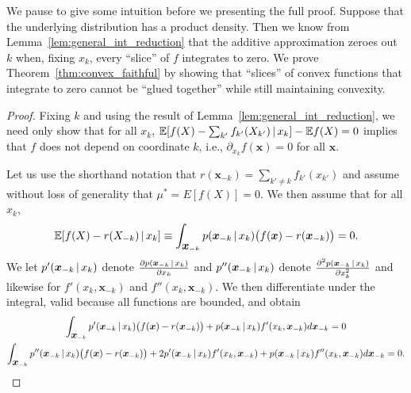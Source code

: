 We pause to give some intuition before we presenting the full proof.
Suppose that the underlying distribution has a product density.
Then we know from Lemma~\ref{lem:general_int_reduction} that the
additive approximation zeroes out $k$ when, fixing $x_k$, every
``slice'' of $f$ integrates to zero. We prove
Theorem~\ref{thm:convex_faithful} by showing that ``slices'' of convex
functions that integrate to zero cannot be ``glued together'' while
still maintaining convexity.


\begin{proof}

Fixing $k$ and using the result of
Lemma~\ref{lem:general_int_reduction}, 
we need only show that for all $x_k$, $ {\mathbb E}[ f(X) - \sum_{k'}
f_{k'}(X_{k'}) {\,|\,} x_k] - {\mathbb E} f(X) = 0 $ 
implies that $f$ does not depend on coordinate $k$, i.e., 
$\partial_{x_k} f(\mathbf{x}) = 0$ for all $\mathbf{x}$.

Let us use the shorthand notation that $r(\mathbf{x}_{-k}) = \sum_{k'
  \neq k} f_{k'}(x_{k'})$ and assume without loss of generality that
$\mu^* = E[f(X)] = 0$. We then assume that for all $x_k$,
\begin{equation}
 {\mathbb E}[ f(X) - r(X_{-k})  {\,|\,} x_k] \equiv 
 \int_{\mbox{\boldmath $x$}_{-k}}  p(\mbox{\boldmath $x$}_{-k} {\,|\,} x_k ) 
 \big(f(\mbox{\boldmath $x$}) - r(\mbox{\boldmath $x$}_{-k}) \big) = 0.
\end{equation}
We let $p'(\mbox{\boldmath $x$}_{-k} {\,|\,} x_k)$ denote 
$\frac{\partial p(\mbox{\boldmath $\scriptstyle x$}_{-k} {\,|\,} x_k)}{\partial x_k}$ and 
$p''(\mbox{\boldmath $x$}_{-k} {\,|\,} x_k)$ denote 
$\frac{\partial^2 p(\mbox{\boldmath $\scriptstyle x$}_{-k} {\,|\,} x_k)}{\partial x_k^2}$ and
likewise for $f'(x_k, \mathbf{x}_{-k})$ and $f''(x_k,
\mathbf{x}_{-k})$. We then differentiate under the integral, valid
because all functions are bounded, and obtain
\begin{gather}
\int_{\mbox{\boldmath $x$}_{-k}} p'(\mbox{\boldmath $x$}_{-k} {\,|\,} x_k) 
\big( f(\mbox{\boldmath $x$}) - r(\mbox{\boldmath $x$}_{-k}) \big) + 
p(\mbox{\boldmath $x$}_{-k} {\,|\,} x_k) f'(x_k, \mbox{\boldmath $x$}_{-k}) d \mbox{\boldmath $x$}_{-k}  = 0 
\label{eqn:integral1a} \\
\int_{\mbox{\boldmath $x$}_{-k}} p''(\mbox{\boldmath $x$}_{-k} {\,|\,} x_k) 
\big( f(\mbox{\boldmath $x$}) - r(\mbox{\boldmath $x$}_{-k}) \big) 
    + 2 p'(\mbox{\boldmath $x$}_{-k} {\,|\,} x_k) f'(x_k, \mbox{\boldmath $x$}_{-k}) +
p(\mbox{\boldmath $x$}_{-k} {\,|\,} x_k) f''(x_k, \mbox{\boldmath $x$}_{-k}) d\mbox{\boldmath $x$}_{-k}  = 0 .
\end{gather}


\end{proof}
